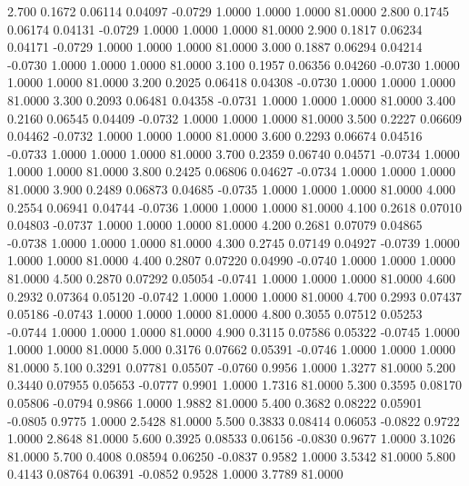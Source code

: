    2.700   0.1672   0.06114   0.04097  -0.0729   1.0000   1.0000   1.0000  81.0000
   2.800   0.1745   0.06174   0.04131  -0.0729   1.0000   1.0000   1.0000  81.0000
   2.900   0.1817   0.06234   0.04171  -0.0729   1.0000   1.0000   1.0000  81.0000
   3.000   0.1887   0.06294   0.04214  -0.0730   1.0000   1.0000   1.0000  81.0000
   3.100   0.1957   0.06356   0.04260  -0.0730   1.0000   1.0000   1.0000  81.0000
   3.200   0.2025   0.06418   0.04308  -0.0730   1.0000   1.0000   1.0000  81.0000
   3.300   0.2093   0.06481   0.04358  -0.0731   1.0000   1.0000   1.0000  81.0000
   3.400   0.2160   0.06545   0.04409  -0.0732   1.0000   1.0000   1.0000  81.0000
   3.500   0.2227   0.06609   0.04462  -0.0732   1.0000   1.0000   1.0000  81.0000
   3.600   0.2293   0.06674   0.04516  -0.0733   1.0000   1.0000   1.0000  81.0000
   3.700   0.2359   0.06740   0.04571  -0.0734   1.0000   1.0000   1.0000  81.0000
   3.800   0.2425   0.06806   0.04627  -0.0734   1.0000   1.0000   1.0000  81.0000
   3.900   0.2489   0.06873   0.04685  -0.0735   1.0000   1.0000   1.0000  81.0000
   4.000   0.2554   0.06941   0.04744  -0.0736   1.0000   1.0000   1.0000  81.0000
   4.100   0.2618   0.07010   0.04803  -0.0737   1.0000   1.0000   1.0000  81.0000
   4.200   0.2681   0.07079   0.04865  -0.0738   1.0000   1.0000   1.0000  81.0000
   4.300   0.2745   0.07149   0.04927  -0.0739   1.0000   1.0000   1.0000  81.0000
   4.400   0.2807   0.07220   0.04990  -0.0740   1.0000   1.0000   1.0000  81.0000
   4.500   0.2870   0.07292   0.05054  -0.0741   1.0000   1.0000   1.0000  81.0000
   4.600   0.2932   0.07364   0.05120  -0.0742   1.0000   1.0000   1.0000  81.0000
   4.700   0.2993   0.07437   0.05186  -0.0743   1.0000   1.0000   1.0000  81.0000
   4.800   0.3055   0.07512   0.05253  -0.0744   1.0000   1.0000   1.0000  81.0000
   4.900   0.3115   0.07586   0.05322  -0.0745   1.0000   1.0000   1.0000  81.0000
   5.000   0.3176   0.07662   0.05391  -0.0746   1.0000   1.0000   1.0000  81.0000
   5.100   0.3291   0.07781   0.05507  -0.0760   0.9956   1.0000   1.3277  81.0000
   5.200   0.3440   0.07955   0.05653  -0.0777   0.9901   1.0000   1.7316  81.0000
   5.300   0.3595   0.08170   0.05806  -0.0794   0.9866   1.0000   1.9882  81.0000
   5.400   0.3682   0.08222   0.05901  -0.0805   0.9775   1.0000   2.5428  81.0000
   5.500   0.3833   0.08414   0.06053  -0.0822   0.9722   1.0000   2.8648  81.0000
   5.600   0.3925   0.08533   0.06156  -0.0830   0.9677   1.0000   3.1026  81.0000
   5.700   0.4008   0.08594   0.06250  -0.0837   0.9582   1.0000   3.5342  81.0000
   5.800   0.4143   0.08764   0.06391  -0.0852   0.9528   1.0000   3.7789  81.0000
